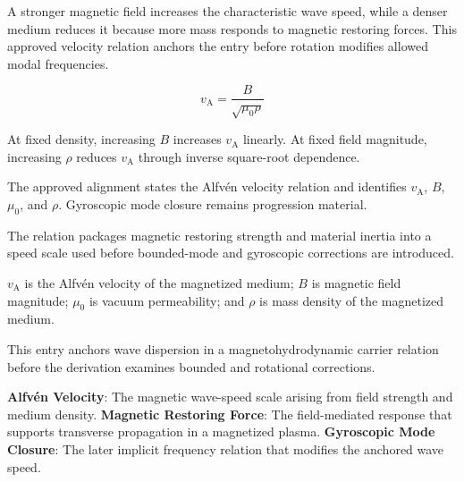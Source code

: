 
A stronger magnetic field increases the characteristic wave speed, while a denser medium reduces it because more mass responds to magnetic restoring forces. This approved velocity relation anchors the entry before rotation modifies allowed modal frequencies.


\[
v_{\mathrm{A}}=\frac{B}{\sqrt{\mu_0\rho}}
\]


At fixed density, increasing \(B\) increases \(v_{\mathrm{A}}\) linearly. At fixed field magnitude, increasing \(\rho\) reduces \(v_{\mathrm{A}}\) through inverse square-root dependence.


The approved alignment states the Alfv\'en velocity relation and identifies \(v_{\mathrm{A}}\), \(B\), \(\mu_0\), and \(\rho\). Gyroscopic mode closure remains progression material.


The relation packages magnetic restoring strength and material inertia into a speed scale used before bounded-mode and gyroscopic corrections are introduced.


\(v_{\mathrm{A}}\) is the Alfv\'en velocity of the magnetized medium; \(B\) is magnetic field magnitude; \(\mu_0\) is vacuum permeability; and \(\rho\) is mass density of the magnetized medium.


This entry anchors wave dispersion in a magnetohydrodynamic carrier relation before the derivation examines bounded and rotational corrections.


\noindent \textbf{Alfv\'en Velocity}: The magnetic wave-speed scale arising from field strength and medium density. \enspace\textbullet\enspace \textbf{Magnetic Restoring Force}: The field-mediated response that supports transverse propagation in a magnetized plasma. \enspace\textbullet\enspace \textbf{Gyroscopic Mode Closure}: The later implicit frequency relation that modifies the anchored wave speed.\par

\endgroup

\ifTZPDarkEdition
{}
\fi

